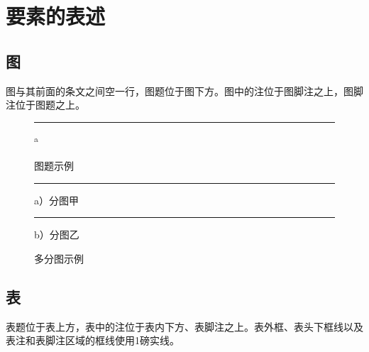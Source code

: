 \chapter{要素的表述}
\section{图}
图与其前面的条文之间空一行，图题位于图下方。图中的注位于图脚注之上，图脚注位于图题之上。

\begin{figure}[htb]
    \centering
    \begin{minipage}{80mm}
        \centering
        \rule{4cm}{3cm}\textsuperscript{a}
    \end{minipage}
    \caption{图题示例}
    \label{fig:example}
\end{figure}

\begin{figure}[htb]
    \centering
    \begin{minipage}{0.45\linewidth}
        \centering
        \rule{25mm}{20mm}\par
        {\heiti a）分图甲}
    \end{minipage}
    \begin{minipage}{0.45\linewidth}
        \centering
        \rule{25mm}{20mm}\par
        {\heiti b）分图乙}
    \end{minipage}
    \caption{多分图示例}
    \label{fig:subfigures}
\end{figure}

\section{表}
表题位于表上方，表中的注位于表内下方、表脚注之上。表外框、表头下框线以及表注和表脚注区域的框线使用1磅实线。

